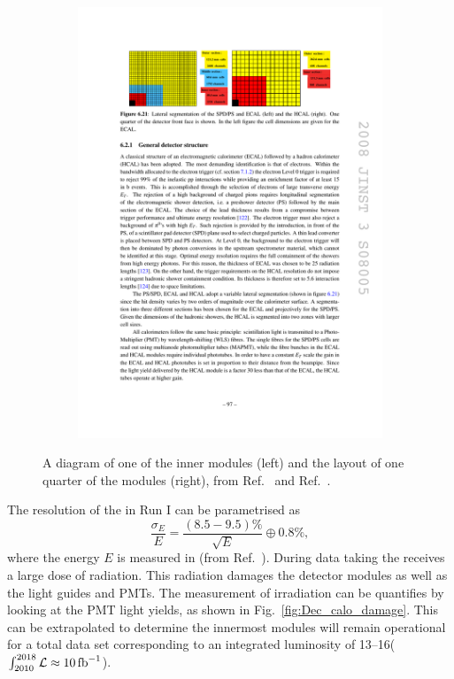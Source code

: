 \begin{figure}[!h]
\begin{subfigure}[m]{0.4\textwidth}
        \includegraphics[width=1.0\textwidth]{figs/Detector/ecal_layout.pdf}
    \end{subfigure}
    \caption{A diagram of one of the inner \ecal modules (left) and the layout of one quarter of the \ecal modules (right), from Ref.~\cite{Alves:2008zz} and Ref.~\cite{doi:1765047}.}
    \label{fig:Dec_ecal_layout}   
\end{figure}

The resolution of the \ecal in Run I can be parametrised as 
\begin{equation}
\frac{\sigma_{E}}{E} = \frac{(8.5-9.5)\%}{\sqrt{E}} \oplus 0.8\%,
\end{equation}
where the energy $E$ is measured in \gev (from Ref.~\cite{1748-0221-12-07-C07024}). During data taking the \ecal receives a large dose of radiation. This radiation damages the detector modules as well as the light guides and PMTs. The measurement of irradiation can be quantifies by looking at the PMT light yields, as shown in Fig.~\ref{fig:Dec_calo_damage}. This can be extrapolated to determine the innermost \ecal modules will remain operational for a total data set corresponding to an integrated luminosity of 13--16\invfb ($\int_{2010}^{2018}\mathcal{L} \approx 10 \mbox{\,fb}^{-1} $).   


